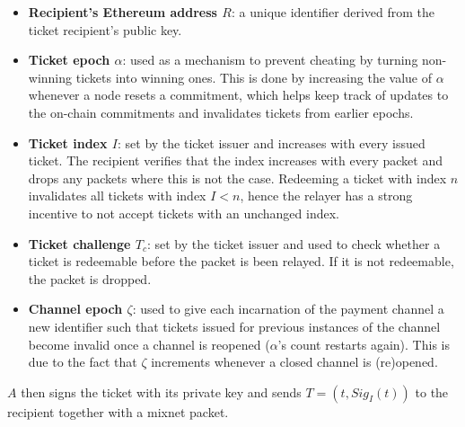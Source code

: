 \begin{itemize}
      \item
            \textbf{Recipient's Ethereum address $R$}: a unique identifier derived from the ticket recipient's public key.
      \item
            \textbf{Ticket epoch $\alpha$}: used as a mechanism to prevent cheating by turning non-winning tickets into winning ones. This is done by increasing the value of $\alpha$ whenever a node resets a commitment, which helps keep track of updates to the on-chain commitments and invalidates tickets from earlier epochs.
      \item
            \textbf{Ticket index $I$}: set by the ticket issuer and increases with every issued ticket. The recipient verifies that the index increases with every packet and drops any packets where this is not the case. Redeeming a ticket with index $n$ invalidates all tickets with index $I<n$, hence the relayer has a strong incentive to not accept tickets with an unchanged index.
      \item
            \textbf{Ticket challenge $T_c$}: set by the ticket issuer and used to check whether a ticket is redeemable before the packet is been relayed. If it is not redeemable, the packet is dropped.
      \item
            \textbf{Channel epoch $\zeta$}: used to give each incarnation of the payment channel a new identifier such that tickets issued for previous instances of the channel become invalid once a channel is reopened ($\alpha$'s count restarts again). This is due to the fact that $\zeta$ increments whenever a closed channel is (re)opened.
\end{itemize}

$A$ then signs the ticket with its private key and sends $T = (t, Sig_I(t))$ to the recipient together with a mixnet packet.
\begin{comment}


\\\textbf{ChainId $c_{Id}$:} The channel identifier which is defined by the ticket issuer in order to determine which channel will be used between issuer and recipient. For example, tickets that are valid on xDAI are not valid on Ethereum.
\\\textbf{Tag $\tau$} is given as a constant and depends on the utilized blockchain. It is used to distinguish HOPR tickets from others with the same structure that are meant for different payment channels and invalidates their usage in HOPR.
\\\textbf{Version $V$} is given as a constant and depends on the utilized blockchain. It is used to invalidate tickets that were issued for previous versions of HOPR from being used in future iterations of the protocol.

\end{comment}

